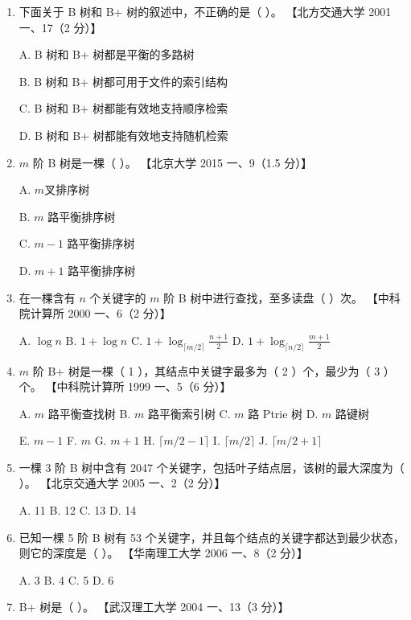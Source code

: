 \documentclass[lang=cn,newtx,10pt,scheme=chinese]{../../elegantbook}
\begin{document}
\begin{enumerate}
    \item 下面关于 B 树和 B+ 树的叙述中，不正确的是（ ）。  
    【北方交通大学 2001 一、17（2 分）】  

    A. B 树和 B+ 树都是平衡的多路树  

    B. B 树和 B+ 树都可用于文件的索引结构  

    C. B 树和 B+ 树都能有效地支持顺序检索  


    D. B 树和 B+ 树都能有效地支持随机检索  

    \item $m$ 阶 B 树是一棵（ ）。  
    【北京大学 2015 一、9（1.5 分）】  

    A. $m$叉排序树  

    B. $m$ 路平衡排序树  

    C. $m-1$ 路平衡排序树  

    D. $m+1$ 路平衡排序树  

    \item 在一棵含有 $n$ 个关键字的 $m$ 阶 B 树中进行查找，至多读盘（ ）次。  
    【中科院计算所 2000 一、6（2 分）】 

    A. $\log n$ \quad B. $1 + \log n$ \quad C. $1 + \log_{\lceil m/2 \rceil} \frac{n+1}{2}$ \quad D. $1 + \log_{\lceil n/2 \rceil} \frac{m+1}{2}$  

    \item $m$ 阶 B+ 树是一棵（ 1 ），其结点中关键字最多为（ 2 ）个，最少为（ 3 ）个。  
    【中科院计算所 1999 一、5（6 分）】  

    A. $m$ 路平衡查找树 \quad B. $m$ 路平衡索引树 \quad C. $m$ 路 Ptrie 树 \quad D. $m$ 路键树  

    E. $m-1$ \quad F. $m$ \quad G. $m+1$ \quad H. $\lceil m/2 - 1 \rceil$  \quad I. $\lceil m/2 \rceil$ \quad J. $\lceil m/2 + 1 \rceil$

    \item 一棵 3 阶 B 树中含有 2047 个关键字，包括叶子结点层，该树的最大深度为（ ）。  
    【北京交通大学 2005 一、2（2 分）】  

    A. 11 \quad B. 12 \quad C. 13 \quad D. 14  

    \item 已知一棵 5 阶 B 树有 53 个关键字，并且每个结点的关键字都达到最少状态，则它的深度是（ ）。  
    【华南理工大学 2006 一、8（2 分）】  

    A. 3 \quad B. 4 \quad C. 5 \quad D. 6  

    \item B+ 树是（ ）。  
    【武汉理工大学 2004 一、13（3 分）】  


\end{enumerate}
\end{document}
